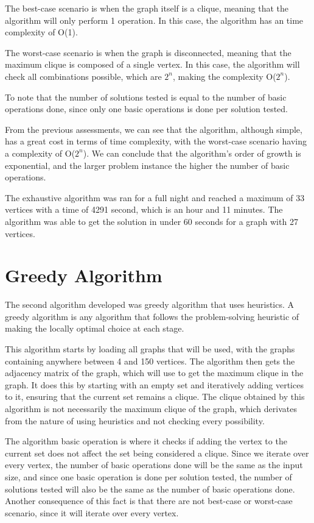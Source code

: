 \documentclass[]{revdetua}
\begin{document}
The best-case scenario is when the graph itself is a clique, meaning that the algorithm will only perform 1 operation. In this case, the algorithm has an time complexity of O(1).

The worst-case scenario is when the graph is disconnected, meaning that the maximum clique is composed of a single vertex. In this case, the algorithm will check all combinations possible, which are \( 2^n \), making the complexity O(\( 2^n \)).

To note that the number of solutions tested is equal to the number of basic operations done, since only one basic operations is done per solution tested.

From the previous assessments, we can see that the algorithm, although simple, has a great cost in terms of time complexity, with the worst-case scenario having a complexity of O(\( 2^n \)). We can conclude that the algorithm's order of growth is exponential, and the larger problem instance the higher the number of basic operations.

The exhaustive algorithm was ran for a full night and reached a maximum of 33 vertices with a time of 4291 second, which is an hour and 11 minutes. The algorithm was able to get the solution in under 60 seconds for a graph with 27 vertices.

\section{Greedy Algorithm}

The second algorithm developed was greedy algorithm that uses heuristics. A greedy algorithm is any algorithm that follows the problem-solving heuristic of making the locally optimal choice at each stage. 

This algorithm starts by loading all graphs that will be used, with the graphs containing anywhere between 4 and 150 vertices. The algorithm then gets the adjacency matrix of the graph, which will use to get the maximum clique in the graph. It does this by starting with an empty set and iteratively adding vertices to it, ensuring that the current set remains a clique. The clique obtained by this algorithm is not necessarily the maximum clique of the graph, which derivates from the nature of using heuristics and not checking every possibility.

The algorithm basic operation is where it checks if adding the vertex to the current set does not affect the set being considered a clique. Since we iterate over every vertex, the number of basic operations done will be the same as the input size, and since one basic operation is done per solution tested, the number of solutions tested will also be the same as the number of basic operations done. Another consequence of this fact is that there are not best-case or worst-case scenario, since it will iterate over every vertex.
\end{document}
